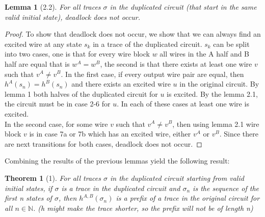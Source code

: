 \documentclass[12pt]{report}
\newtheorem*{theorem}{Theorem}
\newtheorem*{lemma}{Lemma}
\begin{document}
\begin{lemma}[2.2]
For all traces $\sigma$ in the duplicated circuit (that start in the same valid initial state), deadlock does not occur.
\end{lemma}
\begin{proof}
To show that deadlock does not occur, we show that we can always find an excited wire at any state $s_k$ in a trace of the duplicated circuit.  $s_k$ can be split into two cases, one is that for every wire block $w$ all wires in the A half and B half are equal that is $w^A=w^B$, the second is that there exists at least one wire $v$ such that $v^A\neq v^B$.  In the first case, if every output wire pair are equal, then $h^A(s_n)=h^B(s_n)$ and there exists an excited wire $u$ in the original circuit.  By lemma 1 both halves of the duplicated circuit for $u$ is excited.  By the lemma 2.1, the circuit must be in case 2-6 for $u$.  In each of these cases at least one wire is excited.  \\
In the second case, for some wire $v$ such that $v^A\neq v^B$, then using lemma 2.1 wire block $v$ is in case 7a or 7b which has an excited wire, either $v^A$ or $v^B$.  Since there are next transitions for both cases, deadlock does not occur.
\end{proof}

Combining the results of the previous lemmas yield the following result:
\begin{theorem}[1]
For all traces $\sigma$ in the duplicated circuit starting from valid initial states, if $\sigma$ is a trace in the duplicated circuit and $\sigma_n$ is the sequence of the first n states of $\sigma$, then $h^{A,B}(\sigma_n)$ is a prefix of a trace in the original circuit for all $n \in \mathbb{N}$.  (h might make the trace shorter, so the prefix will not be of length n) %
\end{theorem}

\end{document}
